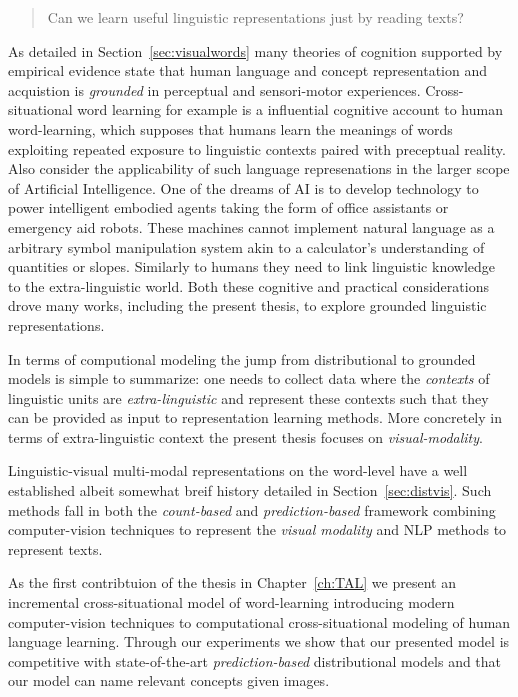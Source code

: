 \begin{quote}
Can we learn useful linguistic representations just by reading texts?
\end{quote}

As detailed in Section~\ref{sec:visualwords} many theories of cognition supported by empirical
evidence state that human language and concept representation and acquistion is \emph{grounded}
in perceptual and sensori-motor experiences. Cross-situational word learning for example is 
a influential cognitive account to human word-learning, which supposes that humans learn the
meanings of words exploiting repeated exposure to linguistic contexts paired with preceptual reality.
Also consider the applicability of such language represenations in the larger scope of Artificial 
Intelligence. One of the dreams of AI is to develop technology to power intelligent embodied agents
taking the form of office assistants or emergency aid robots. These machines cannot implement natural
language as a arbitrary symbol manipulation system akin to a calculator's understanding of quantities or slopes. 
Similarly to humans they need
to link linguistic knowledge to the extra-linguistic world. Both these cognitive and practical considerations
drove many works, including the present thesis, to explore grounded linguistic representations.

In terms of computional modeling the jump from 
distributional to grounded models is simple to summarize: one needs to collect data where
the \emph{contexts} of linguistic units are \emph{extra-linguistic} and represent these contexts such
that they can be provided as input to representation learning methods.
More concretely in terms of extra-linguistic context the present thesis focuses on \emph{visual-modality}.

Linguistic-visual multi-modal representations on the word-level have a well established albeit somewhat breif history 
detailed in Section~\ref{sec:distvis}. Such methods fall in both the \emph{count-based}
and \emph{prediction-based} framework combining computer-vision techniques to represent the \emph{visual
modality} and NLP methods to represent texts. 

As the first contribtuion of the thesis in Chapter~\ref{ch:TAL} we present an incremental cross-situational
model of word-learning introducing modern computer-vision techniques to computational cross-situational modeling of 
human language learning. Through our experiments we show that our presented model is competitive with state-of-the-art
\emph{prediction-based} distributional models and that our model can name relevant concepts given images. 


